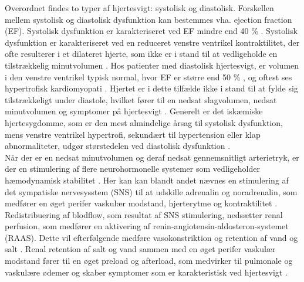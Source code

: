 Overordnet findes to typer af hjertesvigt: systolisk og diastolisk. Forskellen mellem systolisk og diastolisk dysfunktion kan bestemmes vha. ejection fraction (EF). Systolisk dysfunktion er karakteriseret ved EF mindre end 40 \% \citep{Consensus1999} \citep{Fletcher2001}. Systolisk dysfunktion er karakteriseret ved en reduceret venstre ventrikel kontraktilitet, der ofte resulterer i et dilateret hjerte, som ikke er i stand til at vedligeholde en tilstrækkelig minutvolumen \citep{Mudd2008} \citep{Consensus1999} \citep{Fletcher2001}. Hos patienter med diastolisk hjertesvigt, er volumen i den venstre ventrikel typisk normal, hvor EF er større end 50 \% \citep{Ruzumna1996},  og oftest ses hypertrofisk kardiomyopati \citep{Braunwald2013}. Hjertet er i dette tilfælde ikke i stand til at fylde sig tilstrækkeligt under diastole, hvilket fører til en nedsat slagvolumen, nedsat minutvolumen og symptomer på hjertesvigt \citep{Ruzumna1996} \citep{Willerson1995}\citep{Fletcher2001}. Generelt er det iskæmiske hjertesygdomme, som er den mest almindelige årsag til systolisk dysfunktion, mens venstre ventrikel hypertrofi, sekundært til hypertension eller klap abnormaliteter, udgør størstedelen ved diastolisk dysfunktion \citep{Mcalister1997}.\\
Når der er en nedsat minutvolumen og deraf nedsat gennemsnitligt arterietryk, er der en stimulering af flere neurohormonelle systemer som vedligeholder hæmodynamisk stabilitet \citep{Mccance1998}. Her kan kan blandt andet nævnes en stimulering af det sympatiske nervesysstem (SNS) til at udskille adrenalin og noradrenalin, som medfører en øget perifer vaskulær modstand, hjerterytme og kontraktilitet \citep{Fletcher2001}. Redistribuering af blodflow, som resultat af SNS stimulering, nedsætter renal perfusion, som medfører en aktivering af renin-angiotensin-aldosteron-systemet (RAAS). Dette vil efterfølgende medføre vasokonstriktion og retention af vand og salt \citep{Mccance1998}. Renal retention af salt og vand sammen med en øget perifer vaskulær modstand fører til en øget preload og afterload, som medvirker til pulmonale og vaskulære ødemer og skaber symptomer som er karakteristisk ved hjertesvigt \citep{Mccance1998}.\\
